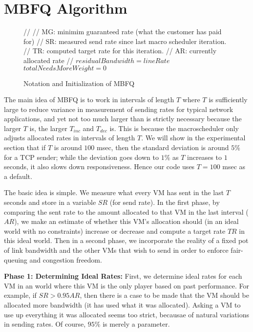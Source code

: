 \section{MBFQ Algorithm}
\label{sec:algorithm}

\begin{figure}
{\footnotesize
\begin{algorithmic}
\State //
\State // MG: minimim guaranteed rate (what the customer has paid for)
\State // SR: measured send rate since last macro scheduler iteration.
\State // TR: computed target rate for this iteration.
\State // AR: currently allocated rate
\State //
\State $residualBandwidth = lineRate$
\State $totalNeedsMoreWeight = 0$
\end{algorithmic}
}
\caption{Notation and Initialization of MBFQ}
\end{figure}

The main idea of MBFQ is to work in intervals of length $T$ where $T$ is
sufficiently large to reduce variance in measurement of sending rates for
typical network applications, and yet not too much larger than is strictly
necessary because the larger $T$ is, the larger $T_{inc}$ and $T_{dec}$ is.
This is because the macroscheduler only adjusts allocated rates in intervals of
length $T$.   We will show in the experimental section that if $T$ is around
$100$ msec, then the standard deviation is around $5\%$ for a TCP sender; while
the deviation goes down to $1\%$ as $T$ increases to $1$ seconds, it also slows
down responsiveness.  Hence our code uses $T = 100$ msec as a default.

The basic idea is simple.  We measure what every VM has sent in the last $T$
seconds and store in a variable $SR$ (for send rate).  In the first phase, by
comparing the sent rate to the amount  allocated to that VM in the last interval
($AR$), we make an estimate of whether this VM's allocation should (in an ideal
world with no constraints) increase or decrease and compute a target rate $TR$
in this ideal world. Then in a second phase, we incorporate the reality of a
fixed pot of link bandwidth and the other VMs that wish to send in order to
enforce fair-queuing and congestion freedom.

{\bf Phase 1: Determining Ideal Rates:}  First, we determine ideal rates for
each VM in an world where this VM is the only player based on past performance.
For example, if $SR > 0.95 AR$, then there is a case to be made that the VM
should be allocated more bandwidth (it has used what it was allocated).  Asking
a VM to use up everything it was allocated seems too strict, becausae of natural
variations in sending rates.  Of course, $95\%$ is merely a parameter.    

